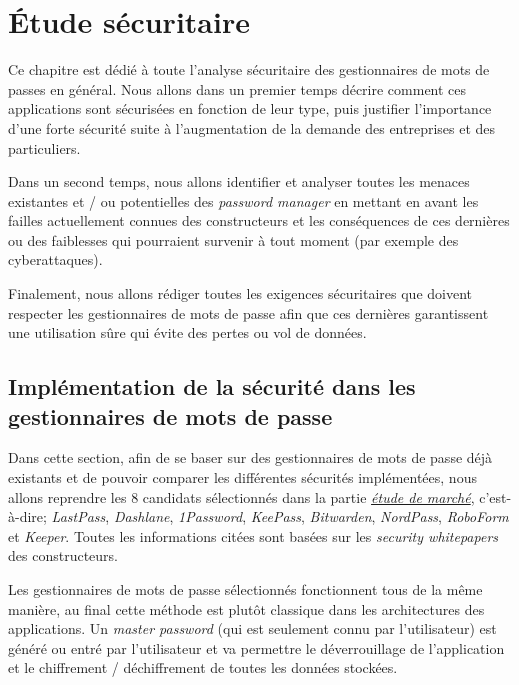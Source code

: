 
\chapter{Étude sécuritaire}
\label{ch:etude_secu}

Ce chapitre est dédié à toute l'analyse sécuritaire des gestionnaires de mots de passes en général. Nous allons dans un premier temps décrire comment ces applications sont sécurisées en fonction de leur type, puis justifier l'importance d'une forte sécurité suite à l'augmentation de la demande des entreprises et des particuliers.

Dans un second temps, nous allons identifier et analyser toutes les menaces existantes et / ou potentielles des \textit{password manager} en mettant en avant les failles actuellement connues des constructeurs et les conséquences de ces dernières ou des faiblesses qui pourraient survenir à tout moment (par exemple des cyberattaques).

Finalement, nous allons rédiger toutes les exigences sécuritaires que doivent respecter les gestionnaires de mots de passe afin que ces dernières garantissent une utilisation sûre qui évite des pertes ou vol de données.

\section{Implémentation de la sécurité dans les gestionnaires de mots de passe}

Dans cette section, afin de se baser sur des gestionnaires de mots de passe déjà existants et de pouvoir comparer les différentes sécurités implémentées, nous allons reprendre les 8 candidats sélectionnés dans la partie \hyperref[ch:etude_marche]{\textit{étude de marché}}, c'est-à-dire; \textit{LastPass}, \textit{Dashlane}, \textit{1Password}, \textit{KeePass}, \textit{Bitwarden}, \textit{NordPass}, \textit{RoboForm} et \textit{Keeper}. Toutes les informations citées sont basées sur les \textit{security whitepapers} des constructeurs\cite{lastpasssecurity}\cite{dashlanesecurity}\cite{1passwordsecurity}\cite{keepasssecurity}\cite{bitwardensecurity}.

Les gestionnaires de mots de passe sélectionnés fonctionnent tous de la même manière, au final cette méthode est plutôt classique dans les architectures des applications. Un \textit{master password} (qui est seulement connu par l'utilisateur) est généré ou entré par l'utilisateur et va permettre le déverrouillage de l'application et le chiffrement / déchiffrement de toutes les données stockées. 



